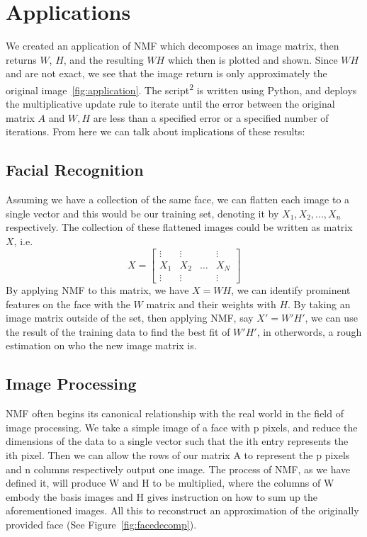 \documentclass[
10pt, %
a4paper, %
oneside, %
headinclude,footinclude, %
BCOR5mm, %
]{scrartcl}
\begin{document}
\section{Applications}

We created an application of NMF which decomposes an image matrix, then returns $W$, $H$, and the resulting $WH$ which then is plotted and shown. Since $WH$ and are not exact, we see that the image return is only approximately the original image~\vref{fig:application}. The script\textsuperscript{2} is written using Python, and deploys the multiplicative update rule to iterate until the error between the original matrix $A$ and $W,H$ are less than a specified error or a specified number of iterations. From here we can talk about implications of these results:

\let\thefootnote\relax{}

\subsection{Facial Recognition}
Assuming we have a collection of the same face, we can flatten each image to a single vector and this would be our training set, denoting it by $X_{1},X_{2},...,X_{n}$ respectively. The collection of these flattened images could be written as matrix $X$, i.e.
$$X=\begin{bmatrix}
        \vdots & \vdots &       & \vdots \\
        X_{1}  & X_{2}  & \dots & X_{N}  \\
        \vdots & \vdots &       & \vdots
    \end{bmatrix}$$
By applying NMF to this matrix, we have $X=WH$, we can identify prominent features on the face with the $W$ matrix and their weights with $H$. By taking an image matrix outside of the set, then applying NMF, say $X'=W'H'$, we can use the result of the training data to find the best fit of $W'H'$, in otherwords, a rough estimation on who the new image matrix is.
\subsection{Image Processing}
NMF often begins its canonical relationship with the real world in the field of image processing. We take a simple image of a face with p pixels, and reduce the dimensions of the data to a single vector such that the ith entry represents the ith pixel. Then we can allow the rows of our matrix A to represent the p pixels and n columns respectively output one image. The process of NMF, as we have defined it, will produce W and H to be multiplied, where the columns of W embody the basis images and H gives instruction on how to sum up the aforementioned images. All this to reconstruct an approximation of the originally provided face (See Figure~\vref{fig:facedecomp}).
\end{document}
